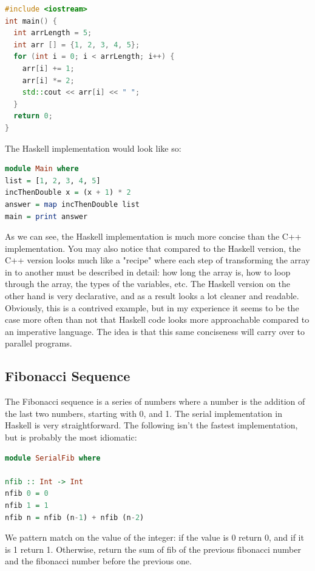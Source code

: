 \documentclass[a4paper, 10pt]{article}
\begin{document}
\begin{lstlisting}[language=C++, caption=C++ example]
#include <iostream>
int main() {
  int arrLength = 5;
  int arr [] = {1, 2, 3, 4, 5};
  for (int i = 0; i < arrLength; i++) {
    arr[i] += 1;
    arr[i] *= 2;
    std::cout << arr[i] << " ";
  }
  return 0;
}
\end{lstlisting}

The Haskell implementation would look like so:

\begin{lstlisting}[language=Haskell, caption=Haskell example]
module Main where
list = [1, 2, 3, 4, 5]
incThenDouble x = (x + 1) * 2
answer = map incThenDouble list
main = print answer
\end{lstlisting}

As we can see, the Haskell implementation is much more concise than the C++ implementation. You may also notice that compared to the Haskell version, the C++ version looks much like a "recipe" where each step of transforming the array in to another must be described in detail: how long the array is, how to loop through the array, the types of the variables, etc. The Haskell version on the other hand is very declarative, and as a result looks a lot cleaner and readable. Obviously, this is a contrived example, but in my experience it seems to be the case more often than not that Haskell code looks more approachable compared to an imperative language. The idea is that this same conciseness will carry over to parallel programs.

\subsection{Fibonacci Sequence}
The Fibonacci sequence is a series of numbers where a number is the addition of the last two numbers, starting with 0, and 1. The serial implementation in Haskell is very straightforward. The following isn't the fastest implementation, but is probably the most idiomatic:

\begin{lstlisting}[language=Haskell, caption=Haskell Fibonacci]
module SerialFib where

nfib :: Int -> Int
nfib 0 = 0
nfib 1 = 1
nfib n = nfib (n-1) + nfib (n-2)
\end{lstlisting}

We pattern match on the value of the integer: if the value is 0 return 0, and if it is 1 return 1. Otherwise, return the sum of fib of the previous fibonacci number and the fibonacci number before the previous one. 
\end{document}

